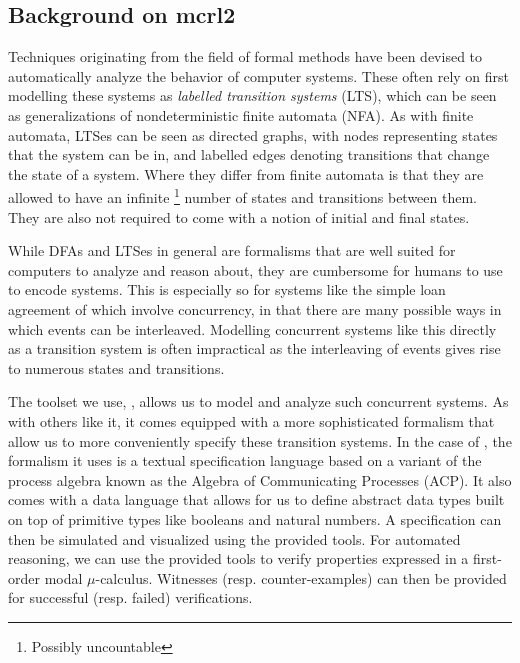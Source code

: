 \documentclass{article}
\begin{document}

\subsection{Background on mcrl2}
Techniques originating from the field of formal methods have been devised to
automatically analyze the behavior of computer systems.
These often rely on first modelling these systems as
\textit{labelled transition systems} (LTS), which can be seen as
generalizations of nondeterministic finite automata (NFA).
As with finite automata, LTSes can be seen as directed graphs, with nodes
representing states that the system can be in, and labelled edges denoting
transitions that change the state of a system.
Where they differ from finite automata is that they are allowed to have an
infinite \footnote{Possibly uncountable} number of states and transitions
between them.
They are also not required to come with a notion of initial and final states.

While DFAs and LTSes in general are formalisms that are well suited for
computers to analyze and reason about, they are cumbersome for humans to use
to encode systems.
This is especially so for systems like the simple loan agreement of
\cite{contract_as_automaton} which involve concurrency, in that there are
many possible ways in which events can be interleaved.
Modelling concurrent systems like this directly as a transition system is
often impractical as the interleaving of events gives rise to numerous states
and transitions.

The toolset we use, \mcrl, allows us to model and analyze such concurrent systems.
As with others like it, it comes equipped with a more sophisticated formalism
that allow us to more conveniently specify these transition systems.
In the case of \mcrl, the formalism it uses is a textual specification
language \cite{mcrl_book} based on a variant of the process algebra known
as the Algebra of Communicating Processes (ACP).
It also comes with a data language that allows for us to define abstract data
types built on top of primitive types like booleans and natural numbers.
A specification can then be simulated and visualized using the provided tools.
For automated reasoning, we can use the provided tools to verify properties
expressed in a first-order modal $\mu$-calculus.
Witnesses (resp. counter-examples) can then be provided for successful
(resp. failed) verifications.
\end{document}
